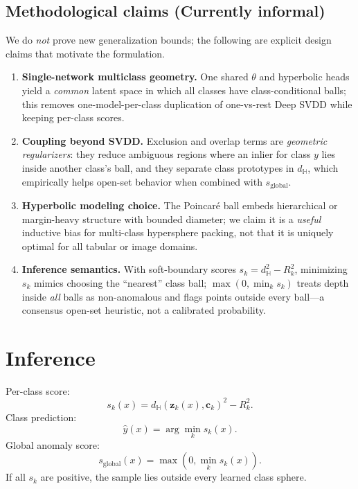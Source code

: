 \documentclass[conference]{IEEEtran}
\begin{document}
\subsection{Methodological claims (Currently informal)}\label{sec:claims}
We do \emph{not} prove new generalization bounds; the following are explicit design claims that motivate the formulation.
\begin{enumerate}
\item \textbf{Single-network multiclass geometry.} One shared $\theta$ and hyperbolic heads yield a \emph{common} latent space in which all classes have class-conditional balls; this removes one-model-per-class duplication of one-vs-rest Deep SVDD while keeping per-class scores.
\item \textbf{Coupling beyond SVDD.} Exclusion and overlap terms are \emph{geometric regularizers}: they reduce ambiguous regions where an inlier for class $y$ lies inside another class's ball, and they separate class prototypes in $d_{\mathbb{H}}$, which empirically helps open-set behavior when combined with $s_{\text{global}}$.
\item \textbf{Hyperbolic modeling choice.} The Poincar\'e ball embeds hierarchical or margin-heavy structure with bounded diameter; we claim it is a \emph{useful} inductive bias for multi-class hypersphere packing, not that it is uniquely optimal for all tabular or image domains.
\item \textbf{Inference semantics.} With soft-boundary scores $s_k{=}d_{\mathbb{H}}^2{-}R_k^2$, minimizing $s_k$ mimics choosing the ``nearest'' class ball; $\max(0,\min_k s_k)$ treats depth inside \emph{all} balls as non-anomalous and flags points outside every ball---a consensus open-set heuristic, not a calibrated probability.
\end{enumerate}

\section{Inference}
Per-class score:
\begin{equation}
s_k(x)=d_{\mathbb{H}}(\mathbf{z}_k(x),\mathbf{c}_k)^2 - R_k^2.
\end{equation}
Class prediction:
\begin{equation}
\hat{y}(x)=\arg\min_k s_k(x).
\end{equation}
Global anomaly score:
\begin{equation}
s_{\text{global}}(x)=\max\left(0,\min_k s_k(x)\right).
\end{equation}
If all $s_k$ are positive, the sample lies outside every learned class sphere.
\end{document}
